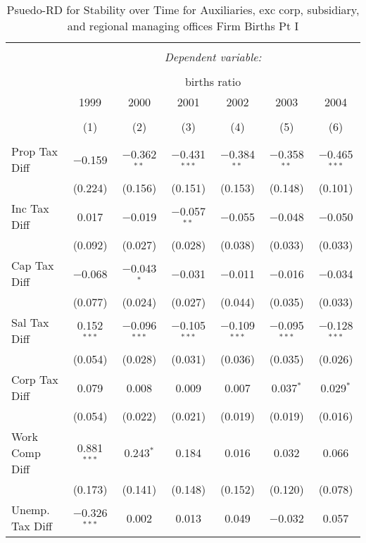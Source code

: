 
\begin{table}[!htbp] \centering 
  \caption{Psuedo-RD for Stability over Time for  Auxiliaries, exc corp, subsidiary, and regional managing offices Firm Births Pt I} 
  \label{95year} 
\small 
\begin{tabular}{@{\extracolsep{5pt}}lcccccc} 
\\[-1.8ex]\hline 
\hline \\[-1.8ex] 
 & \multicolumn{6}{c}{\textit{Dependent variable:}} \\ 
\cline{2-7} 
\\[-1.8ex] & \multicolumn{6}{c}{births ratio} \\ 
 & 1999 & 2000 & 2001 & 2002 & 2003 & 2004 \\ 
\\[-1.8ex] & (1) & (2) & (3) & (4) & (5) & (6)\\ 
\hline \\[-1.8ex] 
 Prop Tax Diff & $-$0.159 & $-$0.362$^{**}$ & $-$0.431$^{***}$ & $-$0.384$^{**}$ & $-$0.358$^{**}$ & $-$0.465$^{***}$ \\ 
  & (0.224) & (0.156) & (0.151) & (0.153) & (0.148) & (0.101) \\ 
  Inc Tax Diff & 0.017 & $-$0.019 & $-$0.057$^{**}$ & $-$0.055 & $-$0.048 & $-$0.050 \\ 
  & (0.092) & (0.027) & (0.028) & (0.038) & (0.033) & (0.033) \\ 
  Cap Tax Diff & $-$0.068 & $-$0.043$^{*}$ & $-$0.031 & $-$0.011 & $-$0.016 & $-$0.034 \\ 
  & (0.077) & (0.024) & (0.027) & (0.044) & (0.035) & (0.033) \\ 
  Sal Tax Diff & 0.152$^{***}$ & $-$0.096$^{***}$ & $-$0.105$^{***}$ & $-$0.109$^{***}$ & $-$0.095$^{***}$ & $-$0.128$^{***}$ \\ 
  & (0.054) & (0.028) & (0.031) & (0.036) & (0.035) & (0.026) \\ 
  Corp Tax Diff & 0.079 & 0.008 & 0.009 & 0.007 & 0.037$^{*}$ & 0.029$^{*}$ \\ 
  & (0.054) & (0.022) & (0.021) & (0.019) & (0.019) & (0.016) \\ 
  Work Comp Diff & 0.881$^{***}$ & 0.243$^{*}$ & 0.184 & 0.016 & 0.032 & 0.066 \\ 
  & (0.173) & (0.141) & (0.148) & (0.152) & (0.120) & (0.078) \\ 
  Unemp. Tax Diff & $-$0.326$^{***}$ & 0.002 & 0.013 & 0.049 & $-$0.032 & 0.057 \\ 

\end{tabular}
\end{table}

